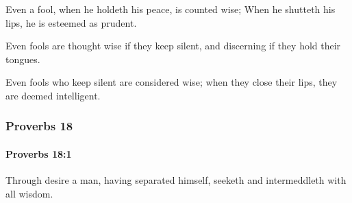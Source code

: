 			\begin{versebox}
					\item[BHS] 
					\item[ASV] Even a fool, when he holdeth his peace, is counted wise; When he shutteth his lips, he is esteemed as prudent.
					\item[NIV] Even fools are thought wise if they keep silent, and discerning if they hold their tongues.
					\item[NRSV] Even fools who keep silent are considered wise; when they close their lips, they are deemed intelligent.
			\end{versebox}
	\subsubsection{Proverbs 18} %
		\label{PROVERBS-18}

		\paragraph{Proverbs 18:1} %
			\label{PROVERBS-18-1}

			Through desire a man, having separated himself, seeketh and intermeddleth with all wisdom.

